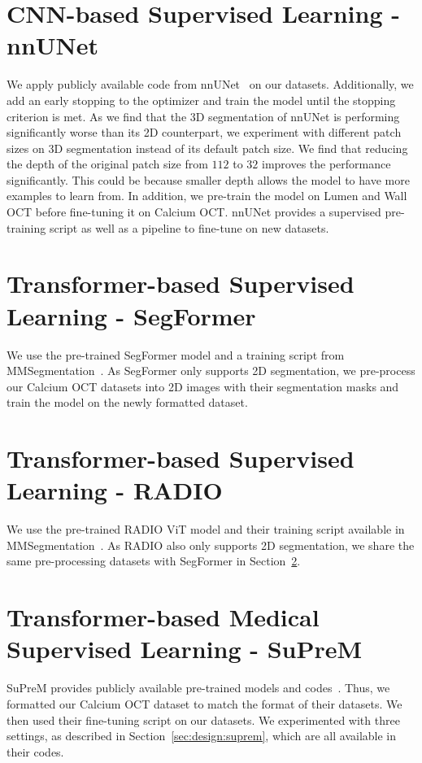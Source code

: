 \documentclass[a4paper,11pt,oneside]{report}
\begin{document}
\section{CNN-based Supervised Learning - nnUNet}
We apply publicly available code from nnUNet~\cite{Isensee2020} on our datasets. Additionally, we add an early stopping to the optimizer and train the model until the stopping criterion is met. As we find that the 3D segmentation of nnUNet is performing significantly worse than its 2D counterpart, we experiment with different patch sizes on 3D segmentation instead of its default patch size. We find that reducing the depth of the original patch size from $112$ to $32$ improves the performance significantly. This could be because smaller depth allows the model to have more examples to learn from. In addition, we pre-train the model on Lumen and Wall OCT before fine-tuning it on Calcium OCT. nnUNet provides a supervised pre-training script as well as a pipeline to fine-tune on new datasets.

\section{Transformer-based Supervised Learning - SegFormer}\label{sec:implementation:segformer}
We use the pre-trained SegFormer model and a training script from MMSegmentation~\cite{mmseg2020}. As SegFormer only supports 2D segmentation, we pre-process our Calcium OCT datasets into 2D images with their segmentation masks and train the model on the newly formatted dataset.

\section{Transformer-based Supervised Learning - RADIO}
We use the pre-trained RADIO ViT model and their training script available in MMSegmentation~\cite{mmseg2020}. As RADIO also only supports 2D segmentation, we share the same pre-processing datasets with SegFormer in Section~\ref{sec:implementation:segformer}.

\section{Transformer-based Medical Supervised Learning - SuPreM}
SuPreM provides publicly available pre-trained models and codes~\cite{Li2024}. Thus, we formatted our Calcium OCT dataset to match the format of their datasets. We then used their fine-tuning script on our datasets. We experimented with three settings, as described in Section~\ref{sec:design:suprem}, which are all available in their codes.
\end{document}
